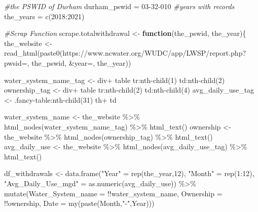 \documentclass[
  12pt,
]{article}
\newenvironment{Shaded}{\begin{snugshade}}{\end{snugshade}}
\newcommand{\AttributeTok}[1]{\textcolor[rgb]{0.77,0.63,0.00}{#1}}
\newcommand{\CommentTok}[1]{\textcolor[rgb]{0.56,0.35,0.01}{\textit{#1}}}
\newcommand{\ControlFlowTok}[1]{\textcolor[rgb]{0.13,0.29,0.53}{\textbf{#1}}}
\newcommand{\DecValTok}[1]{\textcolor[rgb]{0.00,0.00,0.81}{#1}}
\newcommand{\FunctionTok}[1]{\textcolor[rgb]{0.00,0.00,0.00}{#1}}
\newcommand{\NormalTok}[1]{#1}
\newcommand{\OtherTok}[1]{\textcolor[rgb]{0.56,0.35,0.01}{#1}}
\newcommand{\SpecialCharTok}[1]{\textcolor[rgb]{0.00,0.00,0.00}{#1}}
\newcommand{\StringTok}[1]{\textcolor[rgb]{0.31,0.60,0.02}{#1}}
\begin{document}
\begin{Shaded}
\begin{Highlighting}[]
\CommentTok{\#the PSWID of Durham}
\NormalTok{durham\_pswid }\OtherTok{=} \StringTok{\textquotesingle{}03{-}32{-}010\textquotesingle{}}
\CommentTok{\#years with records}
\NormalTok{the\_years }\OtherTok{=} \FunctionTok{c}\NormalTok{(}\DecValTok{2018}\SpecialCharTok{:}\DecValTok{2021}\NormalTok{)}

\CommentTok{\#Scrap Function}
\NormalTok{scrape.totalwithdrawal }\OtherTok{\textless{}{-}} \ControlFlowTok{function}\NormalTok{(the\_pswid, the\_year)\{}
\NormalTok{  the\_website }\OtherTok{\textless{}{-}} \FunctionTok{read\_html}\NormalTok{(}\FunctionTok{paste0}\NormalTok{(}\StringTok{\textquotesingle{}https://www.ncwater.org/WUDC/app/LWSP/report.php?pwsid=\textquotesingle{}}\NormalTok{, }
\NormalTok{                                  the\_pswid, }\StringTok{\textquotesingle{}\&year=\textquotesingle{}}\NormalTok{, the\_year))}
  
\NormalTok{  water\_system\_name\_tag }\OtherTok{\textless{}{-}} \StringTok{\textquotesingle{}div+ table tr:nth{-}child(1) td:nth{-}child(2)\textquotesingle{}}
\NormalTok{  ownership\_tag }\OtherTok{\textless{}{-}} \StringTok{\textquotesingle{}div+ table tr:nth{-}child(2) td:nth{-}child(4)\textquotesingle{}}
\NormalTok{  avg\_daily\_use\_tag }\OtherTok{\textless{}{-}} \StringTok{\textquotesingle{}.fancy{-}table:nth{-}child(31) th+ td\textquotesingle{}}
  
\NormalTok{  water\_system\_name }\OtherTok{\textless{}{-}}\NormalTok{ the\_website }\SpecialCharTok{\%\textgreater{}\%} \FunctionTok{html\_nodes}\NormalTok{(water\_system\_name\_tag) }\SpecialCharTok{\%\textgreater{}\%} \FunctionTok{html\_text}\NormalTok{()}
\NormalTok{  ownership }\OtherTok{\textless{}{-}}\NormalTok{ the\_website }\SpecialCharTok{\%\textgreater{}\%}   \FunctionTok{html\_nodes}\NormalTok{(ownership\_tag) }\SpecialCharTok{\%\textgreater{}\%}  \FunctionTok{html\_text}\NormalTok{()}
\NormalTok{  avg\_daily\_use }\OtherTok{\textless{}{-}}\NormalTok{ the\_website }\SpecialCharTok{\%\textgreater{}\%} \FunctionTok{html\_nodes}\NormalTok{(avg\_daily\_use\_tag) }\SpecialCharTok{\%\textgreater{}\%} \FunctionTok{html\_text}\NormalTok{()}
  
\NormalTok{  df\_withdrawals }\OtherTok{\textless{}{-}} \FunctionTok{data.frame}\NormalTok{(}\StringTok{"Year"} \OtherTok{=} \FunctionTok{rep}\NormalTok{(the\_year,}\DecValTok{12}\NormalTok{),}
                               \StringTok{"Month"} \OtherTok{=} \FunctionTok{rep}\NormalTok{(}\DecValTok{1}\SpecialCharTok{:}\DecValTok{12}\NormalTok{),}
                               \StringTok{"Avg\_Daily\_Use\_mgd"} \OtherTok{=} \FunctionTok{as.numeric}\NormalTok{(avg\_daily\_use)) }\SpecialCharTok{\%\textgreater{}\%} 
    \FunctionTok{mutate}\NormalTok{(}\AttributeTok{Water\_System\_name =} \SpecialCharTok{!!}\NormalTok{water\_system\_name,}
         \AttributeTok{Ownership =} \SpecialCharTok{!!}\NormalTok{ownership,}
         \AttributeTok{Date =} \FunctionTok{my}\NormalTok{(}\FunctionTok{paste}\NormalTok{(Month,}\StringTok{"{-}"}\NormalTok{,Year)))}
  

\end{Highlighting}
\end{Shaded}
\end{document}
